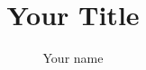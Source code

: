 \documentclass[a4paper,12pt,fleqn]{report}
\begin{document}
\title{Your Title}
\author{Your name}
\maketitle
     


%
%
\tableofcontents

%
%
\listoffigures

%
%
\listoftables






%

  
\end{document}
